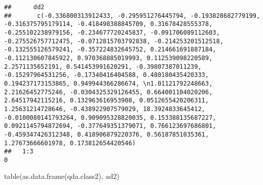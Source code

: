 \documentclass[
  11pt,
]{article}
\newenvironment{Shaded}{\begin{snugshade}}{\end{snugshade}}
\newcommand{\FunctionTok}[1]{\textcolor[rgb]{0.00,0.00,0.00}{#1}}
\newcommand{\NormalTok}[1]{#1}
\begin{document}
\begin{verbatim}
##      dd2
##       c(-0.336800313912433, -0.295951276445794, -0.193828682779199, -0.316375795179114, -0.418498388845709, 0.31678428555378, -0.255102238979156, -0.234677720245837, -0.091706089112603, -0.275526757712475, -0.0712815703792838, -0.214253201512518, -0.132555126579241, -0.357224832645752, 0.214661691887184, -0.112130607845922, 0.970368885019993, 0.112539098220589, 2.2571135652191, 0.541453991620291, -0.39807387011239, -0.15297964531256, -0.17340416404588, 0.480180435420333, 0.194237173153865, 0.949944366286674, \n1.01121792248663, 2.21626452775246, -0.0304325329126455, 0.664001104020206, 2.64517942115216, 0.132963616953908, 0.0512655420206311, 1.25631214728646, -0.438922907579029, 18.3924833645412, -0.0100080141793264, 0.909095328820035, 0.153388135687227, 0.0921145794872694, -0.377649351379071, 0.766123697686801, -0.459347426312348, 0.418906879220376, 0.56187851035361, 1.27673666601978, 0.173812654420546)
##   1:3                                                                                                                                                                                                                                                                                                                                                                                                                                                                                                                                                                                                                                                                                                                                                                                                                                                                                                                                              0
\end{verbatim}

\begin{Shaded}
\begin{Highlighting}[]
\FunctionTok{table}\NormalTok{(}\FunctionTok{as.data.frame}\NormalTok{(qda.class2), ad2)}
\end{Highlighting}
\end{Shaded}
\end{document}
